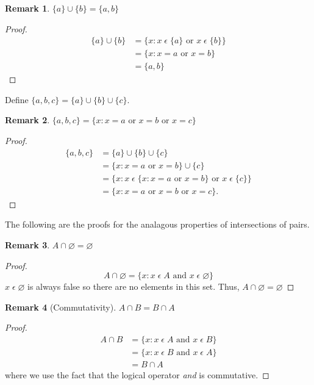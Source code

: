 \documentclass[12pt]{article}
\newtheorem{remark}{Remark}
\begin{document}
\begin{remark}
    $\{a\} \cup \{b\} = \{a, b\}$
\end{remark}
\begin{proof}
    \begin{align*}
        \{a\} \cup \{b\} &= \{x: x\;\epsilon\;\{a\} \text{ or } x\;\epsilon\;\{b\}\}\\
                         &= \{x: x = a \text{ or } x = b\}\\
                         &=\{a, b\}
    \end{align*}
\end{proof}

Define $\{a, b, c\} = \{a\} \cup \{b\} \cup \{c\}$.

\begin{remark}
    $\{a, b, c\} = \{x: x = a \text{ or } x = b \text{ or } x = c\}$
\end{remark}
\begin{proof}
    \begin{align*}
        \{a, b, c\} &= \{a\} \cup \{b\} \cup \{c\}\\
                    &= \{x: x = a \text{ or } x = b\} \cup \{c\}\\
                    &= \{x: x\;\epsilon\;\{x: x = a \text{ or } x = b\} \text{ or } x\;\epsilon\;\{c\}\}\\
                    &= \{x: x = a \text{ or } x = b \text{ or } x = c\}.
    \end{align*}
\end{proof}

The following are the proofs for the analagous properties of intersections of pairs.

\begin{remark}
    $A \cap\varnothing = \varnothing$
\end{remark}
\begin{proof}
    \begin{equation*}
        A \cap \varnothing = \{x: x\;\epsilon\;A \text{ and } x\;\epsilon\;\varnothing\}
    \end{equation*}
    $x\;\epsilon\;\varnothing$ is always false so there are no elements in this set. Thus,
    $A \cap\varnothing = \varnothing$
\end{proof}

\begin{remark}[Commutativity]
    $A \cap B = B \cap A$
\end{remark}
\begin{proof}
    \begin{align*}
        A \cap B &= \{x: x\;\epsilon\;A \text{ and } x\;\epsilon\;B\}\\
                 &= \{x: x\;\epsilon\;B \text{ and } x\;\epsilon\;A\}\\
                 &= B \cap A
    \end{align*}
    where we use the fact that the logical operator \textit{and} is commutative.
\end{proof}
\end{document}
